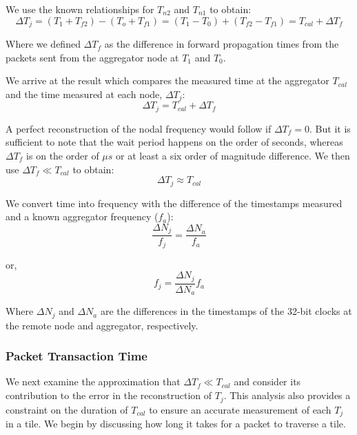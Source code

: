We use the known relationships for $T_{n2}$ and $T_{n1}$ to obtain:
\begin{equation}
  \Delta T_{j} = (T_{1} + T_{f2}) - (T_{o} + T_{f1}) = (T_{1} - T_{0}) + (T_{f2} - T_{f1}) = T_{cal} + \Delta T_{f}
\end{equation}

Where we defined $\Delta T_{f}$ as the difference in forward propagation times from the packets sent from the aggregator node at $T_{1}$ and $T_{0}$.

We arrive at the result which compares the measured time at the aggregator $T_{cal}$ and the time measured at each node, $\Delta T_{j}$:
\begin{equation}
  \Delta T_{j} = T_{cal} + \Delta T_{f}
\end{equation}

A perfect reconstruction of the nodal frequency would follow if $\Delta T_{f} = 0$.
But it is sufficient to note that the wait period happens on the order of seconds, whereas $\Delta T_{f}$ is on the order of $\mu s$ or at least a six order of magnitude difference.
We then use $\Delta T_{f} \ll T_{cal}$ to obtain:
\begin{equation}
  \Delta T_{j} \approx T_{cal}
\end{equation}

We convert time into frequency with the difference of the timestamps measured and a known aggregator frequency ($f_{a}$):
\begin{equation}
   \frac{\Delta N_{j}}{f_{j}} = \frac{\Delta N_{a}}{f_{a}}
\end{equation}

or,
\begin{equation}
   \boxed{f_{j} = \frac{\Delta N_{j}}{\Delta N_{a}}f_{a}}
\end{equation}

Where $\Delta N_{j}$ and $\Delta N_{a}$ are the differences in the timestamps of the 32-bit clocks at the remote node and aggregator, respectively.


\subsubsection{Packet Transaction Time}

 We next examine the approximation that $\Delta T_{f} \ll T_{cal}$ and consider its contribution to the error in the reconstruction of $T_{j}$.
This analysis also provides a constraint on the duration of $T_{cal}$ to ensure an accurate measurement of each $T_{j}$ in a tile.
We begin by discussing how long it takes for a packet to traverse a tile.

